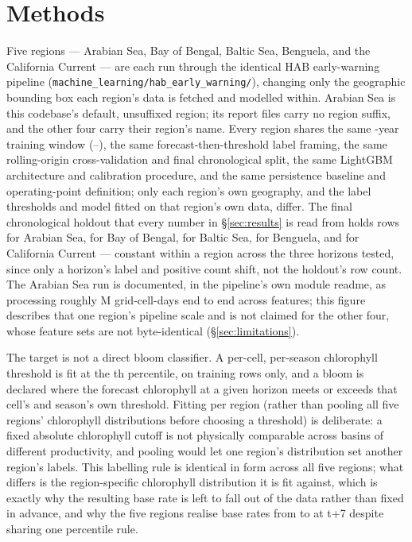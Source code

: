 \section{Methods}
\label{sec:methods}

 Five regions --- Arabian Sea, Bay of
Bengal, Baltic Sea, Benguela, and the California Current --- are each run
through the identical HAB early-warning pipeline
(\texttt{machine\_learning/hab\_early\_warning/}), changing only the
geographic bounding box each region's data is fetched and modelled within.
Arabian Sea is this codebase's default, unsuffixed region; its report files
carry no region suffix, and the other four carry their region's name. Every
region shares the same \HabWindowYears{}-year training window
(\HabStartYear{}--\HabEndYear{}), the same forecast-then-threshold label
framing, the same rolling-origin cross-validation and final chronological
split, the same LightGBM architecture and calibration procedure, and the
same persistence baseline and operating-point definition; only each region's
own geography, and the label thresholds and model fitted on that region's
own data, differ. The final chronological holdout that every number in
\S\ref{sec:results} is read from holds \HabArabianN{} rows for Arabian Sea,
\HabBengalN{} for Bay of Bengal, \HabBalticN{} for Baltic Sea,
\HabBenguelaN{} for Benguela, and \HabCaliforniaN{} for California Current
--- constant within a region across the three horizons tested, since only a
horizon's label and positive count shift, not the holdout's row count. The
Arabian Sea run is documented, in the pipeline's own module readme, as
processing roughly \HabArabianGridCellDays{}M grid-cell-days end to end
across \HabArabianFeatureCount{} features; this figure describes that one
region's pipeline scale and is not claimed for the other four, whose feature
sets are not byte-identical (\S\ref{sec:limitations}).

 The target is not a
direct bloom classifier. A per-cell, per-season chlorophyll threshold is fit
at the \HabPercentile{}th percentile, on training rows only, and a bloom is
declared where the forecast chlorophyll at a given horizon meets or exceeds
that cell's and season's own threshold. Fitting per region (rather than
pooling all five regions' chlorophyll distributions before choosing a
threshold) is deliberate: a fixed absolute chlorophyll cutoff is not
physically comparable across basins of different productivity, and pooling
would let one region's distribution set another region's labels. This
labelling rule is identical in form across all five regions; what differs is
the region-specific chlorophyll distribution it is fit against, which is
exactly why the resulting base rate is left to fall out of the data rather
than fixed in advance, and why the five regions realise base rates from
\HabArabianBaseSeven{} to \HabCaliforniaBaseSeven{} at t+7 despite sharing
one percentile rule.

